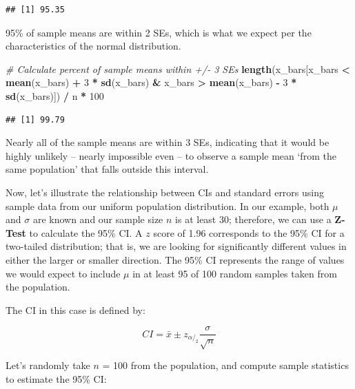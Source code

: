 \documentclass[]{book}
\newenvironment{Shaded}{\begin{snugshade}}{\end{snugshade}}
\newcommand{\CommentTok}[1]{\textcolor[rgb]{0.56,0.35,0.01}{\textit{#1}}}
\newcommand{\DecValTok}[1]{\textcolor[rgb]{0.00,0.00,0.81}{#1}}
\newcommand{\KeywordTok}[1]{\textcolor[rgb]{0.13,0.29,0.53}{\textbf{#1}}}
\newcommand{\NormalTok}[1]{#1}
\newcommand{\OperatorTok}[1]{\textcolor[rgb]{0.81,0.36,0.00}{\textbf{#1}}}
\newcommand{\StringTok}[1]{\textcolor[rgb]{0.31,0.60,0.02}{#1}}
\begin{document}
\begin{verbatim}
## [1] 95.35
\end{verbatim}

95\% of sample means are within 2 SEs, which is what we expect per the characteristics of the normal distribution.

\begin{Shaded}
\begin{Highlighting}[]
\CommentTok{# Calculate percent of sample means within +/- 3 SEs}
\KeywordTok{length}\NormalTok{(x_bars[x_bars }\OperatorTok{<}\StringTok{ }\KeywordTok{mean}\NormalTok{(x_bars) }\OperatorTok{+}\StringTok{ }\DecValTok{3} \OperatorTok{*}\StringTok{ }\KeywordTok{sd}\NormalTok{(x_bars) }\OperatorTok{&}\StringTok{ }\NormalTok{x_bars }\OperatorTok{>}\StringTok{ }\KeywordTok{mean}\NormalTok{(x_bars) }\OperatorTok{-}\StringTok{ }\DecValTok{3} \OperatorTok{*}\StringTok{ }\KeywordTok{sd}\NormalTok{(x_bars)]) }\OperatorTok{/}\StringTok{ }\NormalTok{n }\OperatorTok{*}\StringTok{ }\DecValTok{100}
\end{Highlighting}
\end{Shaded}

\begin{verbatim}
## [1] 99.79
\end{verbatim}

Nearly all of the sample means are within 3 SEs, indicating that it would be highly unlikely -- nearly impossible even -- to observe a sample mean `from the same population' that falls outside this interval.

Now, let's illustrate the relationship between CIs and standard errors using sample data from our uniform population distribution. In our example, both \(\mu\) and \(\sigma\) are known and our sample size \(n\) is at least 30; therefore, we can use a \textbf{Z-Test} to calculate the 95\% CI. A \(z\) score of 1.96 corresponds to the 95\% CI for a two-tailed distribution; that is, we are looking for significantly different values in either the larger or smaller direction. The 95\% CI represents the range of values we would expect to include \(\mu\) in at least 95 of 100 random samples taken from the population.

The CI in this case is defined by:

\[ CI = \bar{x} \pm z_{\alpha/_2} \frac{\sigma}{\sqrt{n}} \]

Let's randomly take \(n\) = 100 from the population, and compute sample statistics to estimate the 95\% CI:
\end{document}
